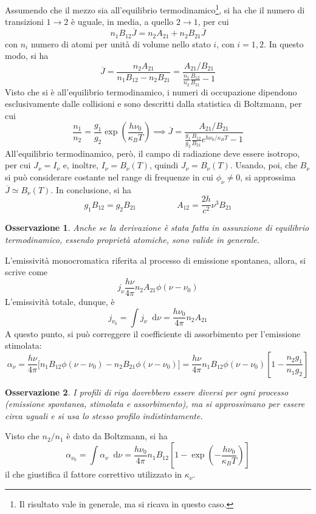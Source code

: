 \documentclass[11pt, a4paper]{scrartcl}
\theoremstyle{style}
\newtheorem{osservazione}{Osservazione}[section]
\theoremstyle{style1}
\newcommand{\dd}{\mathop{}\!\mathrm{d}}
\numberwithin{equation}{subsection}
\begin{document}
Assumendo che il mezzo sia all'equilibrio termodinamico\footnote{Il risultato vale in generale, ma si ricava in questo caso.}, si ha che il numero di transizioni $1\to 2$ \`e uguale, in media, a quello $2\to 1$, per cui
\[
n_1 B_{12}\overline{J} = n_2A_{21} + n_2 B_{21} \overline{J}
\] 
con $n_i$ numero di atomi per unit\`a di volume nello stato $i$, con $i=1,2$.
In questo modo, si ha
\[
\overline{J} = \frac{n_2A_{21}}{ n_1 B_{12} - n_2 B_{21}}  = \frac{A_{21} / B_{21}}{\frac{n_1}{n_2}\frac{B_{12}}{B_{21}} - 1}
\] 
Visto che si \`e all'equilibrio termodinamico, i numeri di occupazione dipendono esclusivamente dalle collisioni e sono descritti dalla statistica di Boltzmann, per cui 
\[
\frac{n_1}{n_2} = \frac{g_1}{g_2} \exp \left(\frac{h\nu _0}{\kappa _B T}\right) \implies \overline{J} = \frac{A_{21} / B_{21}}{\frac{g_1}{g_2}\frac{B_{12}}{B_{21}}e^{ h \nu _0 / \kappa _B T} - 1}
\] 
All'equilibrio termodinamico, per\`o, il campo di radiazione deve essere isotropo, per cui $J_\nu = I_\nu$ e, inoltre, $I_\nu  = B_\nu (T)$, quindi $J_\nu  = B_\nu (T)$.
Usando, poi, che $B_\nu $ si pu\`o considerare costante nel range di frequenze in cui $\phi _\nu \neq 0$, si approssima $\overline{J} \simeq B_\nu (T)$.
In conclusione, si ha
\[
	g_1 B_{12} = g_2 B_{21} \hspace{2cm} A_{12} = \frac{2h}{c^2} \nu ^3 B_{21}
\] 
\begin{osservazione}
Anche se la derivazione \`e stata fatta in assunzione di equilibrio termodinamico, essendo propriet\`a atomiche, sono valide in generale.
\end{osservazione}
\noindent L'emissivit\`a monocromatica riferita al processo di emissione spontanea, allora, si scrive come
\[
	j_\nu \frac{h\nu }{4\pi} n_2 A_{21} \phi (\nu -\nu _0)
\] 
L'emissivit\`a totale, dunque, \`e
\[
j_{\nu _0} = \int j_\nu \dd \nu = \frac{h\nu _0}{4 \pi} n_2 A_{21}
\] 
A questo punto, si pu\`o correggere il coefficiente di assorbimento per l'emissione stimolata:
\[
\alpha _\nu = \frac{h\nu }{4\pi}\big[ n_1B_{12} \phi (\nu -\nu _0) - n_2 B_{21} \phi (\nu -\nu _0) \big] = \frac{h\nu }{4\pi} n_1 B_{12} \phi (\nu -\nu _0) \left[ 1- \frac{n_2g_1}{n_1g_2} \right] 
\] 
\begin{osservazione}
I profili di riga dovrebbero essere diversi per ogni processo (emissione spontanea, stimolata e assorbimento), ma si approssimano per essere circa uguali e si usa lo stesso profilo indistintamente.
\end{osservazione}
\noindent Visto che $n_2 / n_1$ \`e dato da Boltzmann, si ha
\[
\alpha _{\nu _0}  = \int \alpha _\nu  \dd \nu  = \frac{h\nu _0}{4 \pi } n_1 B_{12} \left[ 1 - \exp \left(- \frac{h\nu _0}{\kappa _B T}\right)  \right] 
\] 
il che giustifica il fattore correttivo utilizzato in $\kappa _\nu $.
\newpage
\end{document}

